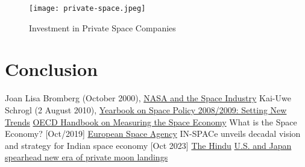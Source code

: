 \documentclass[12pt]{article}
\begin{document}
\begin{figure}[ht]
    \centering
    \texttt{[image: private-space.jpeg]}
    \caption{Investment in Private Space Companies}
    \label{fig:private-space}
\end{figure}

\section{Conclusion}


\begin{thebibliography}{9}
    Joan Lisa Bromberg (October 2000), \href{https://books.google.com/books?id=-UebVg1YqsoC&pg=PA1}{NASA and the Space Industry}
    Kai-Uwe Schrogl (2 August 2010), \href{https://books.google.com/books?id=gcZwzmPnqxkC&pg=PA49}{Yearbook on Space Policy 2008/2009: Setting New Trends}
    \href{https://www.oecd.org/publications/oecd-handbook-on-measuring-the-space-economy-2nd-edition-8bfef437-en.htm}{OECD Handbook on Measuring the Space Economy}
    What is the Space Economy? [Oct/2019] \href{https://space-economy.esa.int/article/33/what-is-the-space-economy#_ftn1}{European Space Agency}
     IN-SPACe unveils decadal vision and strategy for Indian space economy [Oct 2023]
    \href{https://www.thehindu.com/sci-tech/science/indias-space-economy-has-potential-to-reach-35200-crore-44-billion-by-2033-with-about-8-of-global-share/article67403193.ece}{The Hindu}
     \href{https://asia.nikkei.com/Business/Aerospace-Defense-Industries/U.S.-and-Japan-spearhead-new-era-of-private-moon-landings}{U.S. and Japan spearhead new era of private moon landings}
\end{thebibliography}
\end{document}

